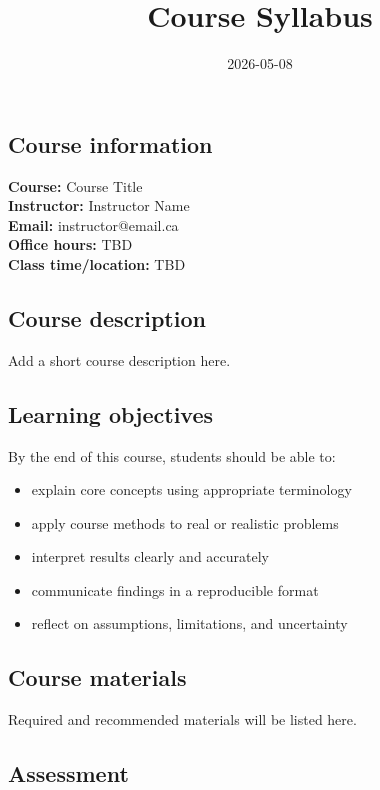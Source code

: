 \documentclass[
  letterpaper,
  DIV=11,
  numbers=noendperiod]{scrartcl}
\title{Course Syllabus}
\author{}
\date{2026-05-08}
\providecommand{\tightlist}{%
  \setlength{\itemsep}{0pt}\setlength{\parskip}{0pt}}
\begin{document}
\maketitle


\subsection{Course information}\label{course-information}

\textbf{Course:} Course Title\\
\textbf{Instructor:} Instructor Name\\
\textbf{Email:} instructor@email.ca\\
\textbf{Office hours:} TBD\\
\textbf{Class time/location:} TBD

\subsection{Course description}\label{course-description}

Add a short course description here.

\subsection{Learning objectives}\label{learning-objectives}

By the end of this course, students should be able to:

\begin{itemize}
\tightlist
\item
  explain core concepts using appropriate terminology
\item
  apply course methods to real or realistic problems
\item
  interpret results clearly and accurately
\item
  communicate findings in a reproducible format
\item
  reflect on assumptions, limitations, and uncertainty
\end{itemize}

\subsection{Course materials}\label{course-materials}

Required and recommended materials will be listed here.

\subsection{Assessment}\label{assessment}
\end{document}
